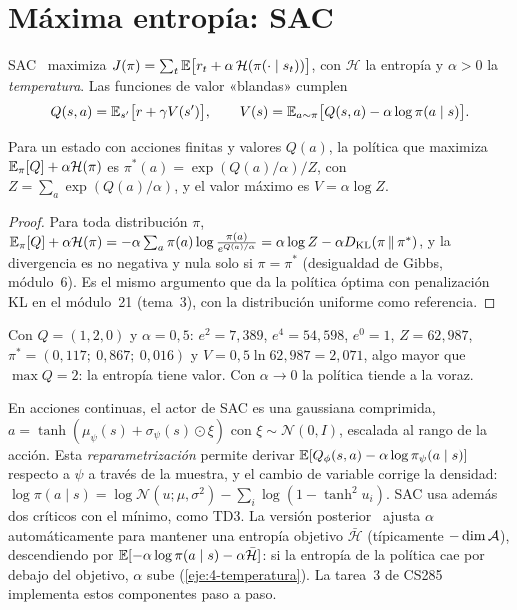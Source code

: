 \section{Máxima entropía: SAC}

\begin{definicion}\label{def:maxent}
SAC~\cite{sac} maximiza $J(\pi)=\sum_t\mathbb{E}\bigl[r_t+\alpha\,\mathcal H(\pi(\cdot\mid s_t))\bigr]$, con $\mathcal H$ la entropía y $\alpha>0$ la \emph{temperatura}. Las funciones de valor «blandas» cumplen
\[
Q(s,a)=\mathbb{E}_{s'}\bigl[r+\gamma V(s')\bigr],\qquad V(s)=\mathbb{E}_{a\sim\pi}\bigl[Q(s,a)-\alpha\log\pi(a\mid s)\bigr].
\]
\end{definicion}

\begin{proposicion}\label{prop:blanda}
Para un estado con acciones finitas y valores $Q(a)$, la política que maximiza $\mathbb{E}_\pi[Q]+\alpha\mathcal H(\pi)$ es $\pi^{*}(a)=\exp(Q(a)/\alpha)/Z$, con $Z=\sum_a\exp(Q(a)/\alpha)$, y el valor máximo es $V=\alpha\log Z$.
\end{proposicion}

\begin{proof}
Para toda distribución $\pi$, $\mathbb{E}_\pi[Q]+\alpha\mathcal H(\pi)=-\alpha\sum_a\pi(a)\log\frac{\pi(a)}{e^{Q(a)/\alpha}}=\alpha\log Z-\alpha D_{\mathrm{KL}}(\pi\,\|\,\pi^{*})$, y la divergencia es no negativa y nula solo si $\pi=\pi^{*}$ (desigualdad de Gibbs, módulo~6). Es el mismo argumento que da la política óptima con penalización KL en el módulo~21 (tema~3), con la distribución uniforme como referencia.
\end{proof}

\begin{ejemplo}\label{ej:blanda}
Con $Q=(1,2,0)$ y $\alpha=0{,}5$: $e^{2}=7{,}389$, $e^{4}=54{,}598$, $e^{0}=1$, $Z=62{,}987$, $\pi^{*}=(0{,}117;\ 0{,}867;\ 0{,}016)$ y $V=0{,}5\ln62{,}987=2{,}071$, algo mayor que $\max Q=2$: la entropía tiene valor. Con $\alpha\to0$ la política tiende a la voraz.
\end{ejemplo}

En acciones continuas, el actor de SAC es una gaussiana comprimida, $a=\tanh(\mu_\psi(s)+\sigma_\psi(s)\odot\xi)$ con $\xi\sim\mathcal N(0,I)$, escalada al rango de la acción. Esta \emph{reparametrización} permite derivar $\mathbb{E}[Q_\phi(s,a)-\alpha\log\pi_\psi(a\mid s)]$ respecto a $\psi$ a través de la muestra, y el cambio de variable corrige la densidad: $\log\pi(a\mid s)=\log\mathcal N(u;\mu,\sigma^{2})-\sum_i\log(1-\tanh^{2}u_i)$. SAC usa además dos críticos con el mínimo, como TD3. La versión posterior~\cite{sac2} ajusta $\alpha$ automáticamente para mantener una entropía objetivo $\bar{\mathcal H}$ (típicamente $-\dim\mathcal{A}$), descendiendo por $\mathbb{E}[-\alpha\log\pi(a\mid s)-\alpha\bar{\mathcal H}]$: si la entropía de la política cae por debajo del objetivo, $\alpha$ sube (\cref{eje:4-temperatura}). La tarea~3 de CS285~\cite{cs285hw3} implementa estos componentes paso a paso.

